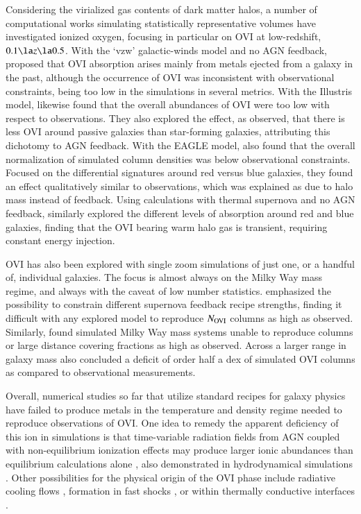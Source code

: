 \documentclass[useAMS,usenatbib]{mnras}
\newcommand{\ovi}{OVI\xspace}
\begin{document}
Considering the virialized gas contents of dark matter halos, a number of computational works simulating statistically representative volumes have investigated ionized oxygen, focusing in particular on \ovi at low-redshift, $0.1 \la z \la 0.5$. With the `vzw' galactic-winds model and no AGN feedback, \cite{ford16} proposed that \ovi absorption arises mainly from metals ejected from a galaxy in the past, although the occurrence of \ovi was inconsistent with observational constraints, being too low in the simulations in several metrics. With the Illustris model, \cite{suresh17} likewise found that the overall abundances of \ovi were too low with respect to observations. They also explored the effect, as observed, that there is less \ovi around passive galaxies than star-forming galaxies, attributing this dichotomy to AGN feedback. With the EAGLE model, \cite{oppenheimer16} also found that the overall normalization of simulated column densities was below observational constraints. Focused on the differential signatures around red versus blue galaxies, they found an effect qualitatively similar to observations, which was explained as due to halo mass instead of feedback. Using calculations with thermal supernova and no AGN feedback, \cite{cen13} similarly explored the different levels of absorption around red and blue galaxies, finding that the \ovi bearing warm halo gas is transient, requiring constant energy injection.  

\ovi has also been explored with single zoom simulations of just one, or a handful of, individual galaxies. The focus is almost always on the Milky Way mass regime, and always with the caveat of low number statistics. \cite{hummels13} emphasized the possibility to constrain different supernova feedback recipe strengths, finding it difficult with any explored model to reproduce $N_{\rm OVI}$ columns as high as observed. Similarly, \cite{liang16} found simulated Milky Way mass systems unable to reproduce columns or large distance covering fractions as high as observed. Across a larger range in galaxy mass \cite{gutcke17} also concluded a deficit of order half a dex of simulated \ovi columns as compared to observational measurements. 

Overall, numerical studies so far that utilize standard recipes for galaxy physics have failed to produce metals in the temperature and density regime needed to reproduce observations of \ovi. One idea to remedy the apparent deficiency of this ion in simulations is that time-variable radiation fields from AGN coupled with non-equilibrium ionization effects may produce larger ionic abundances than equilibrium calculations alone \citep{vasiliev15}, also demonstrated in hydrodynamical simulations \citep{segers17,oppenheimer18a}. Other possibilities for the physical origin of the \ovi phase include radiative cooling flows \citep{bordoloi17,mcquinn18}, formation in fast shocks \citep{gnat09}, or within thermally conductive interfaces \citep{borkowski90,gnat10,armillotta17}.
\end{document}
